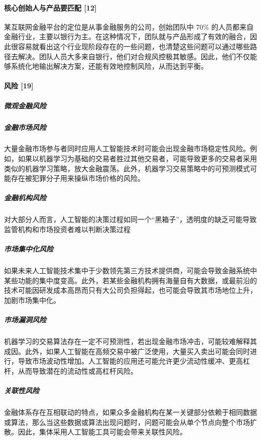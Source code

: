 \documentclass[letterpaper,11pt,english]{sphinxmanual}
\begin{document}
\paragraph{核心创始人与产品要匹配 {[}12{]}}
\label{\detokenize{chapter_project/AI_Finance:id17}}
某互联网金融平台的定位是从事金融服务的公司，创始团队中 70\%
的人员都来自金融行业，主要以银行为主。在这种情况下，团队就与产品形成了有效的融合，因此很容易就看出这个行业现阶段存在的一些问题，也清楚这些问题可以通过哪些路径去解决。团队人员大多来自银行，他们对合规风控极其敏感。因此，他们不仅能够系统化地输出解决方案，还能有效地控制风险，从而达到平衡。


\paragraph{风险 {[}19{]}}
\label{\detokenize{chapter_project/AI_Finance:id18}}

\subparagraph{微观金融风险}
\label{\detokenize{chapter_project/AI_Finance:id19}}

\subparagraph{金融市场风险}
\label{\detokenize{chapter_project/AI_Finance:id20}}
大量金融市场参与者同时应用人工智能技术时可能会出现金融市场稳定性风险。例如，如果以机器学习为基础的交易者胜过其他交易者，可能导致更多的交易者采用类似的机器学习策略，放大金融震荡。此外，机器学习交易策略中的可预测模式可能存在被犯罪分子用来操纵市场价格的风险。


\subparagraph{金融机构风险}
\label{\detokenize{chapter_project/AI_Finance:id21}}
对大部分人而言，人工智能的决策过程如同一个“黑箱子”，透明度的缺乏可能导致监管机构和市场投资者难以判断决策过程


\subparagraph{市场集中化风险}
\label{\detokenize{chapter_project/AI_Finance:id22}}
如果未来人工智能技术集中于少数领先第三方技术提供商，可能会导致金融系统中某些功能的集中度变高。此外，若某些金融机构拥有海量自有大数据，或最前沿的技术可能因研发成本高昂而只有大公司负担得起，也可能会导致其市场地位上升，加剧市场集中化。


\subparagraph{市场漏洞风险}
\label{\detokenize{chapter_project/AI_Finance:id23}}
机器学习的交易算法存在一定不可预测性，若出现金融市场冲击，可能较难解释其成因。此外，如果人工智能在高频交易中被广泛使用，大量买入卖出可能会同时进行，导致市场波动性增加。人工智能的应用还可能允许更少流动性缓冲、更高杠杆，从而导致潜在的流动性或高杠杆风险。


\subparagraph{关联性风险}
\label{\detokenize{chapter_project/AI_Finance:id24}}
金融体系存在互相联动的特点，如果众多金融机构在某一关键部分依赖于相同数据或算法，那么当这些数据或算法出现问题时，问题可能会从单个节点向整个市场扩散。因此，集体采用人工智能工具可能会带来关联性风险。
\end{document}
